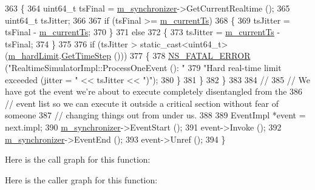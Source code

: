 \begin{DoxyCode}
363       \{
364         uint64\_t tsFinal = \hyperlink{classns3_1_1RealtimeSimulatorImpl_a87a72268b521afcae7ea4c891c398d27}{m\_synchronizer}->GetCurrentRealtime ();
365         uint64\_t tsJitter;
366 
367         \textcolor{keywordflow}{if} (tsFinal >= \hyperlink{classns3_1_1RealtimeSimulatorImpl_a613ff41dee1e66129c4d5cc81c00cf60}{m\_currentTs})
368           \{
369             tsJitter = tsFinal - \hyperlink{classns3_1_1RealtimeSimulatorImpl_a613ff41dee1e66129c4d5cc81c00cf60}{m\_currentTs};
370           \}
371         \textcolor{keywordflow}{else}
372           \{
373             tsJitter = \hyperlink{classns3_1_1RealtimeSimulatorImpl_a613ff41dee1e66129c4d5cc81c00cf60}{m\_currentTs} - tsFinal;
374           \}
375 
376         \textcolor{keywordflow}{if} (tsJitter > static\_cast<uint64\_t>(\hyperlink{classns3_1_1RealtimeSimulatorImpl_a9c3322bfb7203676b5a50f3ac5e4f31f}{m\_hardLimit}.\hyperlink{classns3_1_1Time_a40a7025b73dac7d02f8a4e1e54eaa5b5}{GetTimeStep} ()))
377           \{
378             \hyperlink{group__fatal_ga5131d5e3f75d7d4cbfd706ac456fdc85}{NS\_FATAL\_ERROR} (\textcolor{stringliteral}{"RealtimeSimulatorImpl::ProcessOneEvent (): "}
379                             \textcolor{stringliteral}{"Hard real-time limit exceeded (jitter = "} << tsJitter << \textcolor{stringliteral}{")"});
380           \}
381       \}
382   \}
383 
384   \textcolor{comment}{//}
385   \textcolor{comment}{// We have got the event we're about to execute completely disentangled from the }
386   \textcolor{comment}{// event list so we can execute it outside a critical section without fear of someone}
387   \textcolor{comment}{// changing things out from under us.}
388 
389   EventImpl *\textcolor{keyword}{event} = next.impl;
390   \hyperlink{classns3_1_1RealtimeSimulatorImpl_a87a72268b521afcae7ea4c891c398d27}{m\_synchronizer}->EventStart ();
391   \textcolor{keyword}{event}->Invoke ();
392   \hyperlink{classns3_1_1RealtimeSimulatorImpl_a87a72268b521afcae7ea4c891c398d27}{m\_synchronizer}->EventEnd ();
393   \textcolor{keyword}{event}->Unref ();
394 \}
\end{DoxyCode}


Here is the call graph for this function\+:




Here is the caller graph for this function\+:


